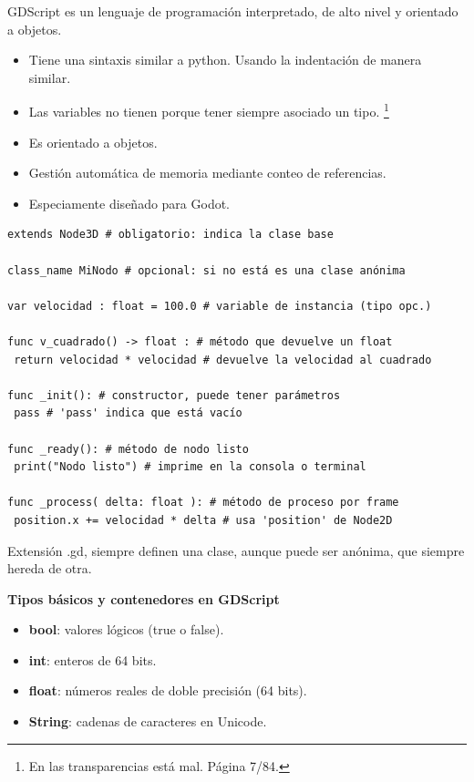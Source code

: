 \documentclass[12pt]{report} %
\providecommand{\tightlist}{%
  \setlength{\itemsep}{0pt}\setlength{\parskip}{0pt}}
\begin{document}
GDScript es un lenguaje de programación interpretado, de alto nivel y
orientado a objetos.

\begin{itemize}
\tightlist
\item
  Tiene una sintaxis similar a python. Usando la indentación de manera
  similar.
\item
  Las variables no tienen porque tener siempre asociado un tipo.
  \footnote{En las transparencias está mal. Página 7/84.}
\item
  Es orientado a objetos.
\item
  Gestión automática de memoria mediante conteo de referencias.
\item
  Especiamente diseñado para Godot.
\end{itemize}

\begin{lstlisting}
extends Node3D # obligatorio: indica la clase base

class_name MiNodo # opcional: si no está es una clase anónima

var velocidad : float = 100.0 # variable de instancia (tipo opc.)

func v_cuadrado() -> float : # método que devuelve un float
 return velocidad * velocidad # devuelve la velocidad al cuadrado

func _init(): # constructor, puede tener parámetros
 pass # 'pass' indica que está vacío

func _ready(): # método de nodo listo
 print("Nodo listo") # imprime en la consola o terminal

func _process( delta: float ): # método de proceso por frame
 position.x += velocidad * delta # usa 'position' de Node2D
\end{lstlisting}

Extensión .gd, siempre definen una clase, aunque puede ser anónima, que
siempre hereda de otra.

\textbf{Tipos básicos y contenedores en GDScript}

\begin{itemize}
\item \textbf{bool}: valores lógicos (true o false).
\item \textbf{int}: enteros de 64 bits.
\item \textbf{float}: números reales de doble precisión (64 bits).
\item \textbf{String}: cadenas de caracteres en Unicode.
\end{itemize}
\end{document}

